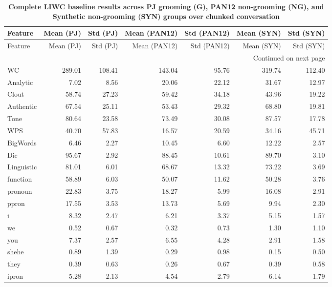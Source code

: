 \begingroup
\scriptsize %
\setlength{\LTcapwidth}{\textwidth}
\setlength\LTleft{\fill}
\setlength\LTright{\fill}
\begin{longtable}{@{}p{3.4cm}rrrrrr@{}}
\caption[LIWC baseline results (based on chunks)]{\textbf{Complete LIWC baseline results across PJ grooming (G), PAN12 non-grooming (NG), and Synthetic non-grooming (SYN) groups over chunked conversation}}\\
\toprule
Feature & Mean (PJ) & Std (PJ) & Mean (PAN12) & Std (PAN12) & Mean (SYN) & Std (SYN) \\
\midrule
\endfirsthead
\toprule
Feature & Mean (PJ) & Std (PJ) & Mean (PAN12) & Std (PAN12) & Mean (SYN) & Std (SYN) \\
\midrule
\endhead
\midrule
\multicolumn{7}{r}{{Continued on next page}} \\
\bottomrule
\endfoot
\bottomrule
\endlastfoot
WC & 289.01 & 108.41 & 143.04 & 95.76 & 319.74 & 112.40 \\
Analytic & 7.02 & 8.56 & 20.06 & 22.12 & 31.67 & 12.97 \\
Clout & 58.74 & 27.23 & 59.42 & 34.18 & 43.96 & 19.22 \\
Authentic & 67.54 & 25.11 & 53.43 & 29.32 & 68.80 & 19.81 \\
Tone & 80.64 & 23.58 & 73.49 & 30.08 & 87.57 & 17.78 \\
WPS & 40.70 & 57.83 & 16.57 & 20.59 & 34.16 & 45.71 \\
BigWords & 6.46 & 2.27 & 10.45 & 6.60 & 12.22 & 2.57 \\
Dic & 95.67 & 2.92 & 88.45 & 10.61 & 89.70 & 3.10 \\
Linguistic & 81.01 & 6.01 & 68.67 & 13.32 & 73.22 & 3.69 \\
function & 58.89 & 6.03 & 50.07 & 11.62 & 50.28 & 3.76 \\
pronoun & 22.83 & 3.75 & 18.27 & 5.99 & 16.08 & 2.91 \\
ppron & 17.55 & 3.53 & 13.73 & 5.69 & 9.94 & 2.30 \\
i & 8.32 & 2.47 & 6.21 & 3.37 & 5.15 & 1.57 \\
we & 0.52 & 0.67 & 0.32 & 0.73 & 1.30 & 1.10 \\
you & 7.37 & 2.57 & 6.55 & 4.28 & 2.91 & 1.58 \\
shehe & 0.89 & 1.39 & 0.29 & 0.98 & 0.15 & 0.50 \\
they & 0.39 & 0.63 & 0.26 & 0.67 & 0.39 & 0.58 \\
ipron & 5.28 & 2.13 & 4.54 & 2.79 & 6.14 & 1.79 \\

\end{longtable}
